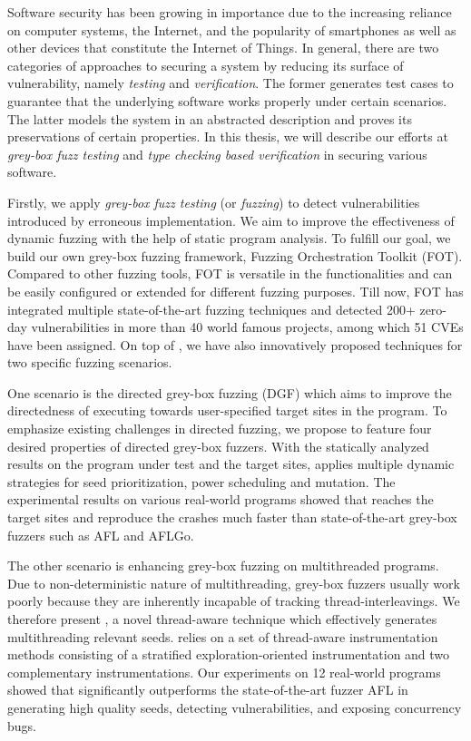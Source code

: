 Software security has been growing in importance due to the increasing reliance on computer systems, the Internet, and the popularity of smartphones as well as other devices that constitute the Internet of Things.
In general, there are two categories of approaches to securing a system by reducing its surface of vulnerability, namely \emph{testing} and \emph{verification}. The former
 generates test cases to guarantee that the underlying software works properly under certain scenarios.
 The latter models the system in an abstracted description and proves its preservations of certain properties.
  In this thesis, we will describe our efforts at \emph{grey-box fuzz testing} and \emph{type checking based verification} in securing various software.

Firstly, we apply \emph{grey-box fuzz testing} (or \emph{fuzzing}) to detect vulnerabilities introduced by erroneous implementation. We aim to improve the effectiveness of dynamic fuzzing with the help of static program analysis. To fulfill our goal, we build our own grey-box fuzzing framework, Fuzzing Orchestration Toolkit (FOT). Compared to other fuzzing tools, FOT is versatile in the functionalities and can be easily configured or extended for different fuzzing purposes. Till now, FOT has integrated multiple state-of-the-art fuzzing techniques and detected 200+ zero-day vulnerabilities in more than 40 world famous projects, among which 51 CVEs have been assigned.
On top of \FOT, we have also innovatively proposed techniques for two specific fuzzing scenarios.

One scenario is the directed grey-box fuzzing (DGF) which aims to improve the directedness of executing towards user-specified target sites in the program. To emphasize existing challenges in \mbox{directed} fuzzing, we propose \dFOT to feature four desired properties of directed grey-box fuzzers. With the statically analyzed results on the program under test and the target sites, \dFOT applies multiple dynamic strategies for seed prioritization, power scheduling and \mbox{mutation}.
The experimental results on various real-world \mbox{programs} showed that \dFOT reaches the target sites and reproduce the crashes much faster than state-of-the-art grey-box fuzzers such as AFL and AFLGo.

The other scenario is enhancing grey-box fuzzing on multithreaded programs. Due to non-deterministic nature of multithreading, grey-box fuzzers usually work poorly because they are inherently incapable of tracking thread-interleavings.
We therefore present \mtfuzz, a novel thread-aware technique which effectively generates multithreading relevant seeds. \mtfuzz relies on a set of thread-aware instrumentation methods consisting of a stratified exploration-oriented instrumentation and two complementary instrumentations. Our experiments on 12 real-world programs showed that \mtfuzz significantly outperforms the state-of-the-art fuzzer AFL in generating high quality seeds, detecting vulnerabilities, and exposing concurrency bugs.

